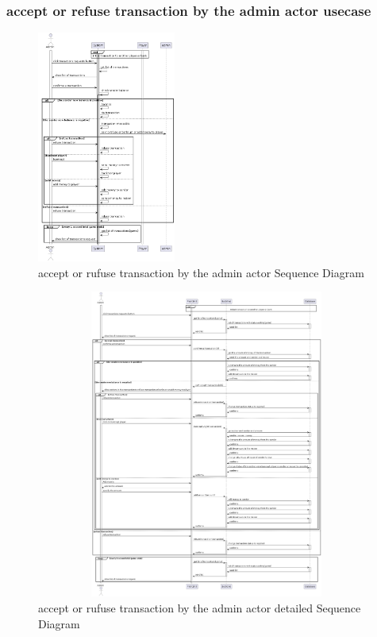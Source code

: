 \documentclass{article}
\begin{document}
\subsubsection{accept or refuse transaction by the admin actor usecase}
\begin{figure}[H]
	\centering
	\includegraphics[height=3in]{../thesis_tex/assets/diagrams/accept_refuse_transaction_SD.png}
	\caption{accept or rufuse transaction by the admin actor Sequence Diagram}
\end{figure}

\begin{figure}[H]
	\centering
	\includegraphics[height=4in,width=6in]{../thesis_tex/assets/diagrams/accept_refuse_transaction_detailedSD.png}
	\caption{accept or rufuse transaction by the admin actor detailed Sequence Diagram}
\end{figure}
\end{document}
